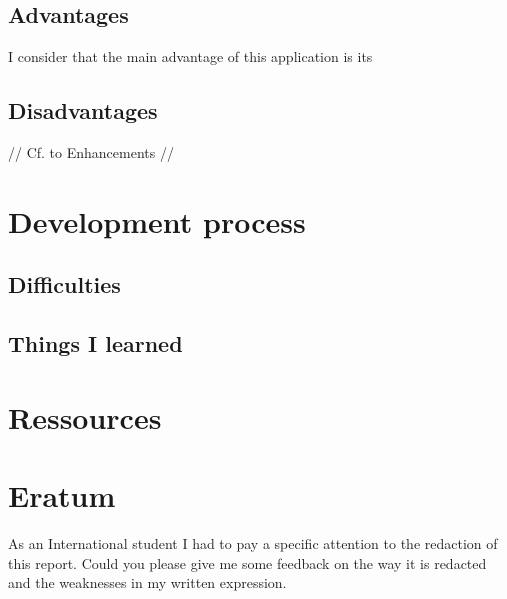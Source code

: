 \documentclass[10pt, a4paper]{article}
\begin{document}
	\subsection{Advantages}
	I consider that the main advantage of this application is its 
	
	\subsection{Disadvantages}
	// Cf. to Enhancements //

	\section{Development process}
	\subsection{Difficulties}
	
	\subsection{Things I learned}
	
	\section{Ressources}
	
	\section{Eratum}
	As an International student I had to pay a specific attention to the redaction of this report. Could you please give me some feedback on the way it is redacted and the weaknesses in my written expression.
		
\end{document}
